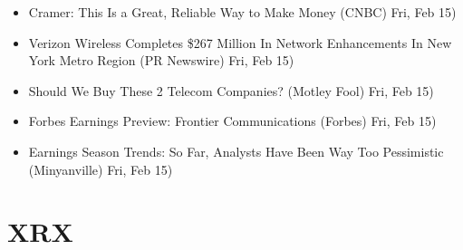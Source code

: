 \documentclass[11pt,asymmetric]{article}
\begin{document}
\begin{itemize}
\item Cramer: This Is a Great, Reliable Way to Make Money (CNBC) Fri, Feb 15)
\item Verizon Wireless Completes \$267 Million In Network Enhancements In New York Metro Region (PR Newswire) Fri, Feb 15)
\item Should We Buy These 2 Telecom Companies? (Motley Fool) Fri, Feb 15)
\item Forbes Earnings Preview: Frontier Communications (Forbes) Fri, Feb 15)
\item Earnings Season Trends: So Far, Analysts Have Been Way Too Pessimistic (Minyanville) Fri, Feb 15)
\end{itemize}

\section*{XRX}
\end{document}
